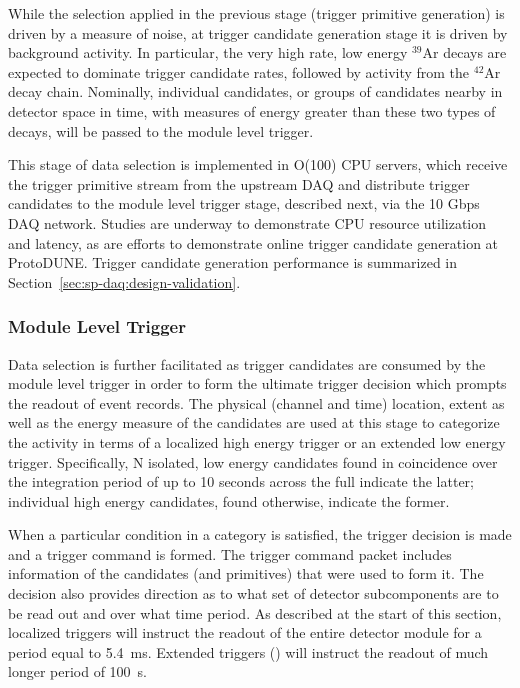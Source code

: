 While the selection applied in the previous stage (trigger primitive
generation) is driven by a
measure of noise, at trigger candidate generation stage it is driven by background activity.  
In particular, the very high rate, low energy
$^{39}$Ar decays are expected to dominate 
trigger candidate rates, followed by activity from the $^{42}$Ar decay
chain. Nominally, individual candidates, or
groups of candidates nearby in detector space in time, with measures of
energy greater than these two types of decays, will be passed to the
module level trigger. 

This stage of data selection is
implemented in O(100) CPU servers, which receive the trigger primitive
stream from the upstream DAQ and distribute trigger candidates to the
module level trigger stage, described next, via the 10 Gbps DAQ network. Studies are
underway to demonstrate CPU resource utilization and latency, as are
efforts to demonstrate online trigger candidate generation at ProtoDUNE.
Trigger candidate generation performance is summarized in
Section~\ref{sec:sp-daq:design-validation}. 



\subsubsection{Module Level Trigger}

Data selection is further facilitated as trigger candidates are consumed
by the module level trigger in order to form the ultimate trigger
decision which prompts the readout of event records. 
The physical (channel and time) location, extent as well as the energy measure of the
candidates are used at this stage to categorize the activity in terms
of a localized high energy trigger or an extended low energy trigger. 
Specifically, N isolated, low energy candidates found in coincidence
over the integration period of up to 10 seconds across the full 
indicate the latter; individual high energy candidates, found
otherwise, indicate the former.

When a particular condition in a category is satisfied, the trigger
decision is made and a trigger command is formed. 
The trigger command packet includes information of the candidates (and primitives)
that were used to form it. 
The decision also provides direction as to what set of detector subcomponents
are to be read out and over what time period. 
As described at the start of this section, localized triggers will instruct
the readout of the entire detector module for a period equal to \SI{5.4}{\milli\second}.  Extended triggers () will
instruct the readout of much longer period of \SI{100}{s}.


